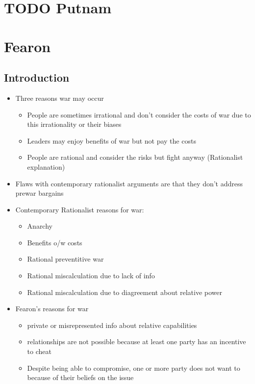 \documentclass[11pt]{article}
\begin{document}
\section{{\bfseries\sffamily TODO} Putnam}
\label{sec:org5ba1fda}
\section{Fearon}
\label{sec:orgbe65f8c}
\subsection{Introduction}
\label{sec:org383b91c}
\begin{itemize}
\item Three reasons war may occur
\begin{itemize}
\item People are sometimes irrational and don't consider the costs of war due to this irrationality or their biases
\item Leaders may enjoy benefits of war but not pay the costs
\item People are rational and consider the risks but fight anyway (Rationalist explanation)
\end{itemize}
\item Flaws with contemporary rationalist arguments are that they don't address prewar bargains
\item Contemporary Rationalist reasons for war:
\begin{itemize}
\item Anarchy
\item Benefits o/w costs
\item Rational preventitive war
\item Rational miscalculation due to lack of info
\item Rational miscalculation due to diagreement about relative power
\end{itemize}
\item Fearon's reasons for war
\begin{itemize}
\item private or misrepresented info about relative capabilities
\item relationships are not possible because at least one party has an incentive to cheat
\item Despite being able to compromise, one or more party does not want to because of their beliefs on the issue
\end{itemize}
\end{itemize}
\end{document}
